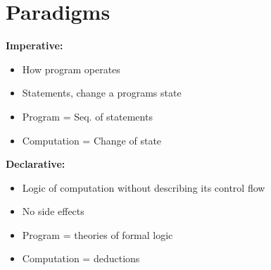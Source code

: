 
\section{Paradigms}

\begin{breakbox}
\textbf{Imperative:}
\begin{itemize}
	\setlength{\itemsep}{0pt}
    \setlength{\parskip}{0pt}
    \setlength{\parsep}{0pt}
    \setlength{\itemindent}{-0.15in}
	\item How program operates
	\item Statements, change a programs state
	\item Program = Seq. of statements
	\item Computation = Change of state
\end{itemize}
\textbf{Declarative:}
\begin{itemize}
	\setlength{\itemsep}{0pt}
    \setlength{\parskip}{0pt}
    \setlength{\parsep}{0pt}
    \setlength{\itemindent}{-0.15in}
	\item Logic of computation without describing its control flow
	\item No side effects
	\item Program = theories of formal logic
	\item Computation = deductions
\end{itemize}
\end{breakbox}

